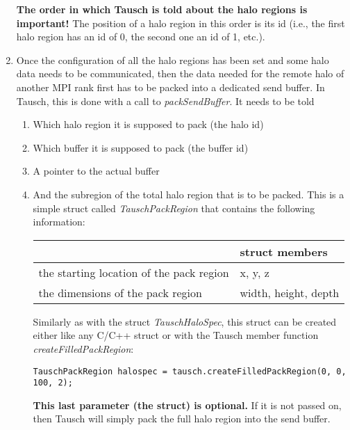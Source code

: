 \documentclass{article}
\begin{document}
\begin{enumerate}
    \textbf{The order in which Tausch is told about the halo regions is important!} The position of a halo region in this order is its id (i.e., the first halo region has an id of 0, the second one an id of 1, etc.).

    \item Once the configuration of all the halo regions has been set and some halo data needs to be communicated, then the data needed for the remote halo of another MPI rank first has to be packed into a dedicated send buffer. In Tausch, this is done with a call to \emph{packSendBuffer}. It needs to be told
    \begin{enumerate}
        \item Which halo region it is supposed to pack (the halo id)
        \item Which buffer it is supposed to pack (the buffer id)
        \item A pointer to the actual buffer
        \item And the subregion of the total halo region that is to be packed. This is a simple struct called \emph{TauschPackRegion} that contains the following information:
        \begin{table}[ht]\centering
        \begin{tabular}{|l|l|}
            \hline
            \rowcolor{black!10}
            & \bfseries struct members\\
            \hline
            the starting location of the pack region & x, y, z \\
            the dimensions of the pack region & width, height, depth \\
            \hline
        \end{tabular}
        \end{table}

        Similarly as with the struct \emph{TauschHaloSpec}, this struct can be created either like any C/C++ struct or with the Tausch member function \emph{createFilledPackRegion}:
        \begin{lstlisting}
TauschPackRegion halospec = tausch.createFilledPackRegion(0, 0, 100, 2);
        \end{lstlisting}

        \textbf{This last parameter (the struct) is optional.} If it is not passed on, then Tausch will simply pack the full halo region into the send buffer.
    \end{enumerate}



\end{enumerate}
\end{document}
